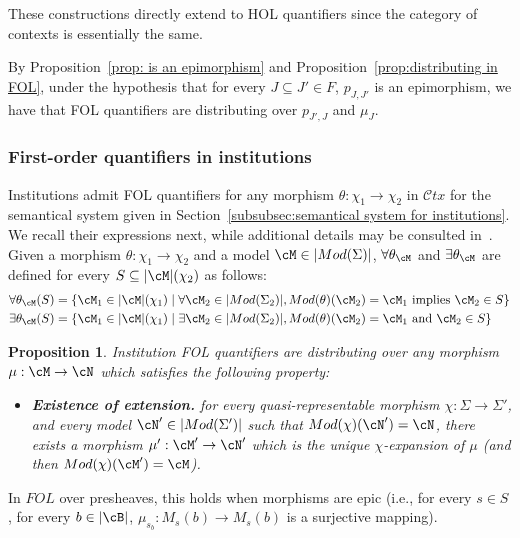 \documentclass[preprint,3p,times]{elsarticle}
\newtheorem{proposition}[definition]{Proposition}
\newcommand{\Ctx}{\mathcal{C}tx}
\begin{document}
\medskip
These constructions directly extend to HOL quantifiers since the category of contexts is essentially the same.

By Proposition~\ref{prop: is an epimorphism} and Proposition~\ref{prop:distributing in FOL}, under the hypothesis that for every $J \subseteq J' \in F$, $p_{J,J'}$ is an epimorphism, we have that FOL quantifiers are distributing over $p_{J',J}$ and $\mu_J$.

\subsubsection{First-order quantifiers in institutions}
\label{institutions-quantifiers}
Institutions admit FOL quantifiers for any morphism $\theta : \chi_1 \to \chi_2$ in $\Ctx$ for the semantical system given in Section~\ref{subsubsec:semantical system for institutions}. We recall their expressions next, while additional details may be consulted in~\cite{AB23}.
Given a morphism $\theta : \chi_1 \to \chi_2$ and a model $\cM \in |Mod(\Sigma)|$, $\forall \theta_{\cM}$ and $\exists \theta_{\cM}$ are defined for every $S \subseteq |\cM|(\chi_2)$ as follows:
\begin{align*}
    \forall \theta_{\cM}(S) &= \{\cM_1 \in |\cM|(\chi_1) \mid \forall \cM_2 \in |Mod(\Sigma_2)|, Mod(\theta)(\cM_2) = \cM_1 \text{ implies } \cM_2 \in S \}\\
    \exists \theta_{\cM}(S) &= \{\cM_1 \in |\cM|(\chi_1) \mid \exists \cM_2 \in |Mod(\Sigma_2)|, Mod(\theta)(\cM_2) = \cM_1 \text{ and } \cM_2 \in S \}
\end{align*}

\begin{proposition}
\label{prop:distribution in institutions}
Institution FOL quantifiers are distributing over any morphism $\mu : \cM \to \cN$ which satisfies the following property: 

\begin{itemize}
    \item {\bf Existence of extension.} for every quasi-representable morphism $\chi : \Sigma \to \Sigma'$, and every model $\cN' \in |Mod(\Sigma')|$ such that $Mod(\chi)(\cN') = \cN$, there exists a morphism  $\mu' : \cM' \to \cN'$ which is the unique $\chi$-expansion of $\mu$ (and then $Mod(\chi)(\cM') = \cM$).
\end{itemize}

\end{proposition}

In $FOL$ over presheaves, this holds when morphisms are epic (i.e., for every $s \in S$, for every $b \in |\cB|$, $\mu_{s_b} : M_s(b) \to M_s(b)$ is a surjective mapping). 
\end{document}
